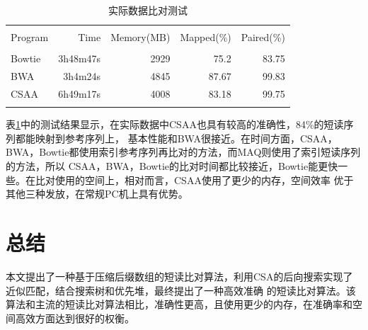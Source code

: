\documentclass[UTF8,adobefonts]{ctexart}
\begin{document}
\begin{table}[htbp]
    \caption{实际数据比对测试}
    \label{tab:tab3}
    \centering
    \begin{tabular}{lrrrr}
       \hline\\
       Program&Time&Memory(MB)&Mapped(\%)&Paired(\%)\\
       \hline\\
       Bowtie&3h48m47s&2929&75.2&83.75\\
       BWA&3h4m24s&4845&87.67&99.83\\
       CSAA&6h49m17s&4008&83.18&99.75\\
       \hline\\
    \end{tabular}
\end{table}

表\ref{tab:tab3}中的测试结果显示，在实际数据中CSAA也具有较高的准确性，84\%的短读序列都能映射到参考序列上，
基本性能和BWA很接近。在时间方面，CSAA，BWA，Bowtie都使用索引参考序列再比对的方法，而MAQ则使用了索引短读序列的方法，所以
CSAA，BWA，Bowtie的比对时间都比较接近，Bowtie能更快一些。在比对使用的空间上，相对而言，CSAA使用了更少的内存，空间效率
优于其他三种发放，在常规PC机上具有优势。

\section{总结}
本文提出了一种基于压缩后缀数组的短读比对算法，利用CSA的后向搜索实现了近似匹配，结合搜索树和优先堆，最终提出了一种高效准确
的短读比对算法。该算法和主流的短读比对算法相比，准确性更高，且使用更少的内存，在准确率和空间高效方面达到很好的权衡。



\end{document}
